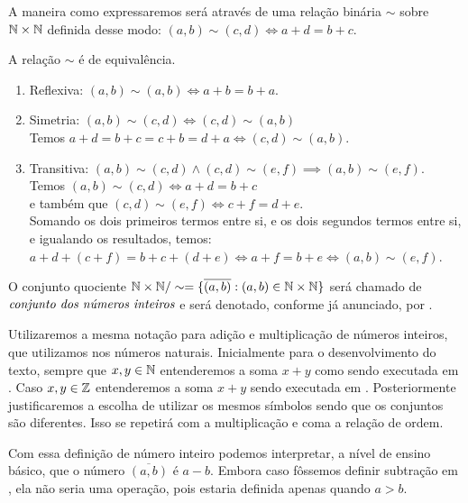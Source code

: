 \documentclass[../main.tex]{subfiles}
\begin{document}
A maneira como expressaremos será através de uma relação binária $\sim$ sobre $\mathbb{N} \times \mathbb{N}$ definida desse modo: $(a,b) \sim (c,d) \iff a+d = b+c$.
\begin{teo}
    A relação $\sim$ é de equivalência.
\end{teo}
\begin{dem}
    \begin{enumerate}[label=(\roman*)]
        \item Reflexiva: $(a,b) \sim (a,b) \iff a+b=b+a$.
        \item Simetria: $(a,b) \sim (c,d) \iff (c,d) \sim (a,b)$ \\
        Temos $ a+d = b+c = c+b = d+a \iff (c,d) \sim (a,b)$.
        \item Transitiva: $(a,b) \sim (c,d) \land (c,d) \sim (e,f) \implies (a,b) \sim (e,f)$. \\
        Temos $(a,b) \sim (c,d) \iff a+d=b+c$ \\
        e também que $(c,d) \sim (e,f) \iff c+f=d+e$. \\
        Somando os dois primeiros termos entre si, e os dois segundos termos entre si, e igualando os resultados, temos: \\ 
        $a+d+(c+f)= b+c+(d+e) \iff a+f = b+e \iff (a,b) \sim (e,f)$.
    \end{enumerate}
\end{dem}
\begin{defi}
    O conjunto quociente $\mathbb{N} \times \mathbb{N} / \sim = \{ \overline{(a,b)}: (a,b) \in \mathbb{N} \times \mathbb{N}\}$ será chamado de $\emph{conjunto dos números inteiros}$ e será denotado, conforme já anunciado, por \Z.
\end{defi}
\begin{obs}
    Utilizaremos a mesma notação para adição e multiplicação de números inteiros, que utilizamos nos números naturais. Inicialmente para o desenvolvimento do texto, sempre que $x,y \in \mathbb{N}$ entenderemos a soma $x+y$ como sendo executada em \N. Caso $x,y \in \mathbb{Z}$ entenderemos a soma $x+y$ sendo executada em \Z. Posteriormente justificaremos a escolha de utilizar os mesmos símbolos sendo que os conjuntos são diferentes. Isso se repetirá com a multiplicação e coma a relação de ordem.
\end{obs}

Com essa definição de número inteiro podemos interpretar, a nível de ensino básico, que o número $\overline{(a,b)}$ é $a - b$. Embora caso fôssemos definir subtração em \N, ela não seria uma operação, pois estaria definida apenas quando $a > b$.
\end{document}
